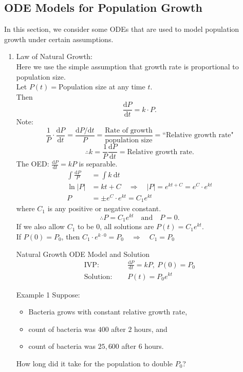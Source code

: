 \documentclass[12pt,a4paper]{article}
\def\d{{\mathrm{d}}}
\begin{document}
\subsection{ODE Models for Population Growth}
In this section, we consider some ODEs that are used to model population growth under certain assumptions. 
\begin{enumerate}
	\item Law of Natural Growth: \\
	Here we use the simple assumption that growth rate is proportional to population size. \\
	Let $P(t)=$Population size at any time $t$.\\
	Then $$\frac{\d P}{\d t}=k\cdot P.$$
	Note: $$\frac{1}{P}\cdot\frac{\d P}{\d t}=\frac{\d P/\d t}{P}=\frac{\text{Rate of growth}}{\text{population size}}=\text{``Relative growth rate"}$$
	$$\therefore k=\frac{1}{P}\frac{\d P}{\d t}=\text{Relative growth rate}.$$
	The OED: $\displaystyle\frac{\d P}{\d t}=kP$ is separable. 
	$$\begin{aligned}
		\int\frac{\d P}{P}&=\int k\ \d t\\
		\ln|P|&=kt+C\quad\Rightarrow\quad|P|=e^{kt+C}=e^C\cdot e^{kt}\\
		P&=\pm e^C\cdot e^{kt}=C_1e^{kt}
	\end{aligned}$$
	where $C_1$ is any positive or negative constant. 
	$$\therefore P=C_1e^{kt}\quad\text{and}\quad P=0.$$
	If we also allow $C_1$ to be 0, all solutions are $P(t)=C_1e^{kt}.$\\
	If $P(0)=P_0$, then $C_1\cdot e^{k\cdot 0}=P_0\quad\Rightarrow\quad C_1=P_0$
	\begin{thm}{Natural Growth ODE Model and Solution}
		$$\begin{aligned}
			\text{IVP: }&\quad\frac{\d P}{\d t}=kP,\ P(0)=P_0\\
			\text{Solution: }&\quad P(t)=P_0e^{kt}
		\end{aligned}$$	
	\end{thm}
	\begin{eg}{Example 1}
		Suppose: 
		\begin{itemize}
			\item Bacteria grows with constant relative growth rate, 
			\item count of bacteria was $400$ after $2$ hours, and
			\item count of bacteria was $25,600$ after $6$ hours. 	
		\end{itemize}
		How long did it take for the population to double $P_0$?

\end{eg}
\end{enumerate}
\end{document}
